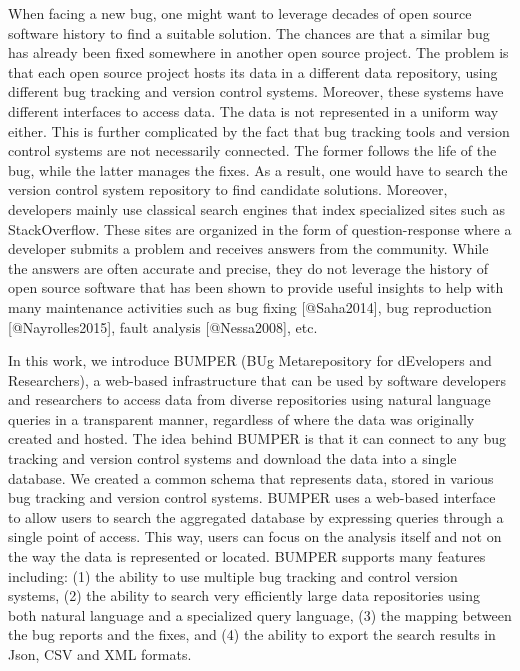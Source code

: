 When facing a new bug, one might want to leverage decades of open source
software history to find a suitable solution. The chances are that a
similar bug has already been fixed somewhere in another open source
project. The problem is that each open source project hosts its data in
a different data repository, using different bug tracking and version
control systems. Moreover, these systems have different interfaces to
access data. The data is not represented in a uniform way either. This
is further complicated by the fact that bug tracking tools and version
control systems are not necessarily connected. The former follows the
life of the bug, while the latter manages the fixes. As a result, one
would have to search the version control system repository to find
candidate solutions. Moreover, developers mainly use classical search
engines that index specialized sites such as StackOverflow. These sites
are organized in the form of question-response where a developer submits
a problem and receives answers from the community. While the answers are
often accurate and precise, they do not leverage the history of open
source software that has been shown to provide useful insights to help
with many maintenance activities such as bug fixing {[}@Saha2014{]}, bug
reproduction {[}@Nayrolles2015{]}, fault analysis {[}@Nessa2008{]}, etc.

In this work, we introduce BUMPER (BUg Metarepository for dEvelopers and
Researchers), a web-based infrastructure that can be used by software
developers and researchers to access data from diverse repositories
using natural language queries in a transparent manner, regardless of
where the data was originally created and hosted. The idea behind BUMPER
is that it can connect to any bug tracking and version control systems
and download the data into a single database. We created a common schema
that represents data, stored in various bug tracking and version control
systems. BUMPER uses a web-based interface to allow users to search the
aggregated database by expressing queries through a single point of
access. This way, users can focus on the analysis itself and not on the
way the data is represented or located. BUMPER supports many features
including: (1) the ability to use multiple bug tracking and control
version systems, (2) the ability to search very efficiently large data
repositories using both natural language and a specialized query
language, (3) the mapping between the bug reports and the fixes, and (4)
the ability to export the search results in Json, CSV and XML formats.

